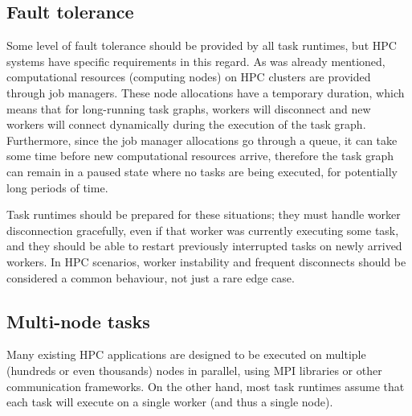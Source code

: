 \subsection{Fault tolerance}
Some level of fault tolerance should be provided by all task runtimes, but HPC systems have
specific requirements in this regard. As was already mentioned, computational resources
(computing nodes) on HPC clusters are provided through job managers. These node allocations have
a temporary duration, which means that for long-running task graphs, workers will disconnect and
new workers will connect dynamically during the execution of the task graph. Furthermore, since
the job manager allocations go through a queue, it can take some time before new computational
resources arrive, therefore the task graph can remain in a paused state where no tasks are being
executed, for potentially long periods of time.

Task runtimes should be prepared for these situations; they must handle worker disconnection
gracefully, even if that worker was currently executing some task, and they should be able to
restart previously interrupted tasks on newly arrived workers. In HPC scenarios, worker
instability and frequent disconnects should be considered a common behaviour, not just a rare
edge case.

\subsection{Multi-node tasks}
Many existing HPC applications are designed to be executed on multiple (hundreds or even
thousands) nodes in parallel, using MPI libraries or other communication frameworks. On the
other hand, most task runtimes assume that each task will execute on a single worker (and thus
a single node).

